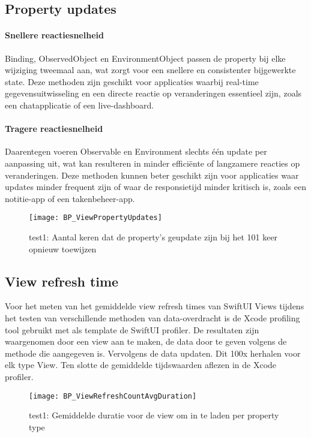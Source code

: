 \newpage
\subsection{Property updates}
\paragraph{Snellere reactiesnelheid}
Binding, ObservedObject en EnvironmentObject passen de property bij elke wijziging tweemaal aan, wat zorgt voor een snellere en consistenter bijgewerkte state. Deze methoden zijn geschikt voor applicaties waarbij real-time gegevensuitwisseling en een directe reactie op veranderingen essentieel zijn, zoals een chatapplicatie of een live-dashboard.

\paragraph{Tragere reactiesnelheid}
Daarentegen voeren Observable en Environment slechts één update per aanpassing uit, wat kan resulteren in minder efficiënte of langzamere reacties op veranderingen. Deze methoden kunnen beter geschikt zijn voor applicaties waar updates minder frequent zijn of waar de responsietijd minder kritisch is, zoals een notitie-app of een takenbeheer-app.


\begin{figure}[htbp]
    \centering
    \texttt{[image: BP\_ViewPropertyUpdates]} 
    \caption{test1: Aantal keren dat de property's geupdate zijn bij het 101 keer opnieuw toewijzen}
    \label{fig:propertyUpdates}
\end{figure}

\newpage
\subsection{View refresh time}
Voor het meten van het gemiddelde view refresh times van SwiftUI Views tijdens het testen van verschillende methoden van data-overdracht is de Xcode profiling tool gebruikt met als template de SwiftUI profiler. De resultaten zijn waargenomen door een view aan te maken, de data door te geven volgens de methode die aangegeven is. Vervolgens de data updaten. Dit 100x herhalen voor elk type View. Ten slotte de gemiddelde tijdswaarden aflezen in de Xcode profiler.

\begin{figure}[htbp]
    \centering
    \texttt{[image: BP\_ViewRefreshCountAvgDuration]} 
    \caption{test1: Gemiddelde duratie voor de view om in te laden per property type}
    \label{fig:propertyRefreshDuration}
\end{figure}

